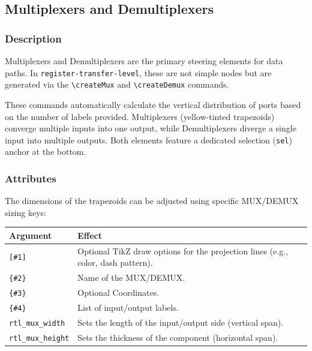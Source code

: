 
\subsection{\sffamily Multiplexers and Demultiplexers}

    \subsubsection{\sffamily Description}
        Multiplexers and Demultiplexers are the primary steering elements for data paths. In \texttt{register-transfer-level}, these are not simple nodes but are generated via the \texttt{\textbackslash createMux} and \texttt{\textbackslash createDemux} commands. 
        
        These commands automatically calculate the vertical distribution of ports based on the number of labels provided. Multiplexers (yellow-tinted trapezoids) converge multiple inputs into one output, while Demultiplexers diverge a single input into multiple outputs. Both elements feature a dedicated selection (\texttt{sel}) anchor at the bottom.

    \subsubsection{\sffamily Attributes}
        The dimensions of the trapezoids can be adjusted using specific MUX/DEMUX sizing keys:

    \begin{center}
        \begin{tabular}{lp{8cm}}
        \toprule
            \textbf{Argument} & \textbf{Effect} \\
            \midrule
            \texttt{[\#1]} & Optional TikZ draw options for the projection lines (e.g., color, dash pattern). \\
            \texttt{\{\#2\}} & Name of the MUX/DEMUX. \\
            \texttt{\{\#3\}} & Optional Coordinates. \\
            \texttt{\{\#4\}} & List of input/output labels. \\
            \texttt{rtl\_mux\_width} & Sets the length of the input/output side (vertical span). \\
            \texttt{rtl\_mux\_height} & Sets the thickness of the component (horizontal span). \\
            \bottomrule
        \end{tabular}
    \end{center}

